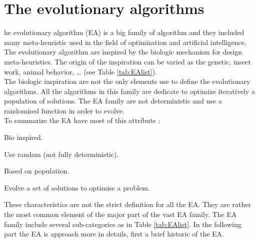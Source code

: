 \section{The evolutionary algorithms }
he evolutionary algorithm (EA) is a big family of algorithm and they included many meta-heuristic used in the field of optimization and artificial intelligence.\\
 The evolutionary algorithm are inspired by the biologic mechanism for design meta-heuristics. The origin of the inspiration can be varied as  the genetic, insect work, animal behavior, … (see Table  \ref{tab:EAlist}). \\
 The biologic inspiration are not the only elements use to define the evolutionary algorithms. All the algorithms in this family are dedicate to optimize iteratively a population of solutions. 
 The EA family are not deterministic and use a randomised function in order to evolve. \\
 To summarize the EA have most of this attribute : 
\begin{description}
\item Bio inspired. 
\item Use random (not fully deterministic).
\item Based on population. 
\item Evolve a set of solutions to optimise a problem.
\end{description}
These characteristics are not the strict definition for all the EA. They are rather the most common element of the major part of the vast EA family. The EA family include several  sub-categories as in Table \ref{tab:EAlist}. In the following  part the EA is approach more in details,  first a brief historic of the EA. 
 
